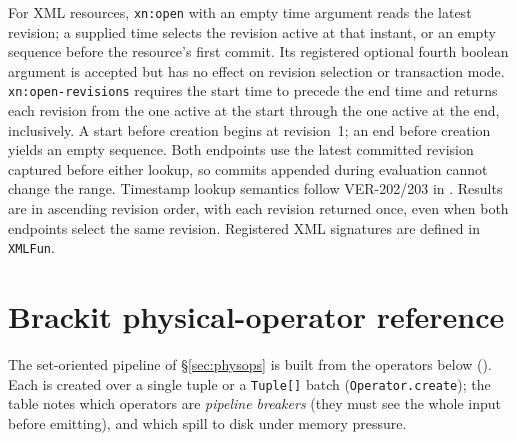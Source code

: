 \documentclass[11pt,a4paper,oneside]{report}
\theoremstyle{sirixthm}
\newcommand{\code}[1]{\texttt{#1}}
\begin{document}
For XML resources, \code{xn:open} with an empty time argument reads the latest revision; a supplied
time selects the revision active at that instant, or an empty sequence before the resource's first
commit. Its registered optional fourth boolean argument is accepted but has no effect on revision
selection or transaction mode. \code{xn:open-revisions} requires the start time to precede the end
time and returns each revision from the one active at the start through the one active at the end,
inclusively. A start before creation begins at revision~1; an end before creation yields an empty
sequence. Both endpoints use the latest committed revision captured before either lookup, so commits
appended during evaluation cannot change the range. Timestamp lookup semantics follow VER-202/203
in . Results are in ascending revision
order, with each revision returned once, even when both endpoints select the same revision.
Registered XML signatures are defined in \code{XMLFun}.

\section{Brackit physical-operator reference}
\label{app:brackitops}

The set-oriented pipeline of \S\ref{sec:physops} is built from the operators below
(). Each is created over a single tuple or a \code{Tuple[]} batch
(\code{Operator.create}); the table notes which operators are \emph{pipeline breakers} (they must see the
whole input before emitting), and which spill to disk under memory pressure.
\end{document}
